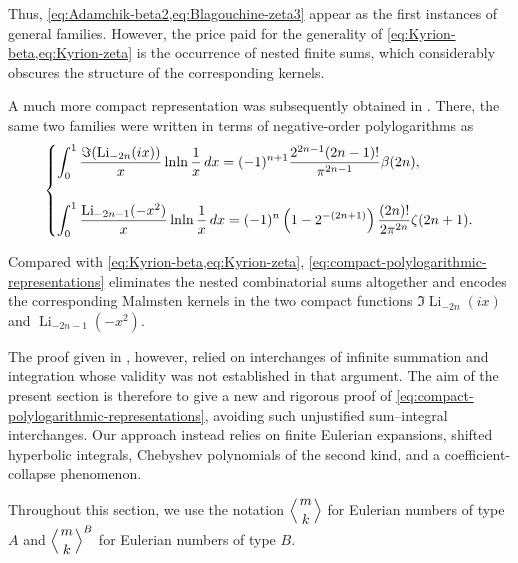 \documentclass[11pt,twoside]{article}
\numberwithin{equation}{section}
\begin{document}
Thus, \cref{eq:Adamchik-beta2,eq:Blagouchine-zeta3} appear as the
first instances of general families. However, the price paid for the
generality of \cref{eq:Kyrion-beta,eq:Kyrion-zeta} is the occurrence
of nested finite sums, which considerably obscures the structure of
the corresponding kernels.

A much more compact representation was subsequently obtained in
\cite{TallaWaffo2025arxiv2511.02843}. There, the same two families
were written in terms of negative-order polylogarithms as
\begin{equation}\label{eq:compact-polylogarithmic-representations}
\begin{dcases}
\displaystyle
\int_{0}^{1}
\frac{\Im\!\left(\operatorname{Li}_{-2n}(ix)\right)}{x}
\ln\!\ln\frac{1}{x}\,dx
=
(-1)^{n+1}
\frac{2^{2n-1}(2n-1)!}{\pi^{2n-1}}
\beta(2n),
\\[3ex]
\displaystyle
\int_{0}^{1}
\frac{\operatorname{Li}_{-2n-1}(-x^{2})}{x}
\ln\!\ln\frac{1}{x}\,dx
=
(-1)^n
\left(1-2^{-(2n+1)}\right)
\frac{(2n)!}{2\pi^{2n}}
\zeta(2n+1).
\end{dcases}
\end{equation}

Compared with \cref{eq:Kyrion-beta,eq:Kyrion-zeta},
\cref{eq:compact-polylogarithmic-representations} eliminates the
nested combinatorial sums altogether and encodes the corresponding
Malmsten kernels in the two compact functions
$\Im\operatorname{Li}_{-2n}(ix)$ and
$\operatorname{Li}_{-2n-1}(-x^{2})$.

The proof given in \cite{TallaWaffo2025arxiv2511.02843}, however,
relied on interchanges of infinite summation and integration whose
validity was not established in that argument. The aim of the present
section is therefore to give a new and rigorous proof of
\cref{eq:compact-polylogarithmic-representations}, avoiding such
unjustified sum--integral interchanges. Our approach instead relies
on finite Eulerian expansions, shifted hyperbolic integrals,
Chebyshev polynomials of the second kind, and a coefficient-collapse
phenomenon.

Throughout this section, we use the notation 
\(\displaystyle\left\langle {m\atop k}\right\rangle\) for Eulerian numbers of type \(A\) and 
\(\displaystyle\left\langle {m\atop k}\right\rangle^{B}\) for Eulerian numbers of type \(B\).
\end{document}
